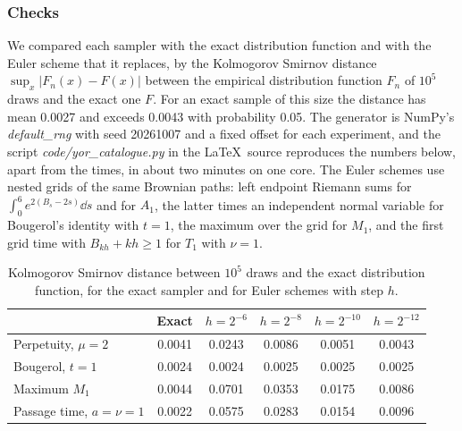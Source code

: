 \subsubsection{Checks} We compared each sampler with the exact distribution function and with the Euler scheme that it replaces, by the Kolmogorov Smirnov distance $\sup_x|F_n(x)-F(x)|$ between the empirical distribution function $F_n$ of $10^5$ draws and the exact one $F$. For an exact sample of this size the distance has mean 0.0027 and exceeds 0.0043 with probability 0.05. The generator is NumPy's \textit{default\_rng} with seed 20261007 and a fixed offset for each experiment, and the script \textit{code/yor\_catalogue.py} in the \LaTeX\ source reproduces the numbers below, apart from the times, in about two minutes on one core. The Euler schemes use nested grids of the same Brownian paths: left endpoint Riemann sums for $\int_0^6e^{2(B_s-2s)}\dd s$ and for $A_1$, the latter times an independent normal variable for Bougerol's identity with $t=1$, the maximum over the grid for $M_1$, and the first grid time with $B_{kh}+kh\ge1$ for $T_1$ with $\nu=1$.

\begin{table}[t]\centering\footnotesize\setlength{\tabcolsep}{4pt}
\caption{Kolmogorov Smirnov distance between $10^5$ draws and the exact distribution function, for the exact sampler and for Euler schemes with step $h$.}\label{tab:yor_checks}
\begin{tabular}{@{}lccccc@{}}
\toprule
& Exact & $h=2^{-6}$ & $h=2^{-8}$ & $h=2^{-10}$ & $h=2^{-12}$\\
\midrule
Perpetuity, $\mu=2$ & 0.0041 & 0.0243 & 0.0086 & 0.0051 & 0.0043\\
Bougerol, $t=1$ & 0.0024 & 0.0024 & 0.0025 & 0.0025 & 0.0025\\
Maximum $M_1$ & 0.0044 & 0.0701 & 0.0353 & 0.0175 & 0.0086\\
Passage time, $a=\nu=1$ & 0.0022 & 0.0575 & 0.0283 & 0.0154 & 0.0096\\
\bottomrule
\end{tabular}
\end{table}

